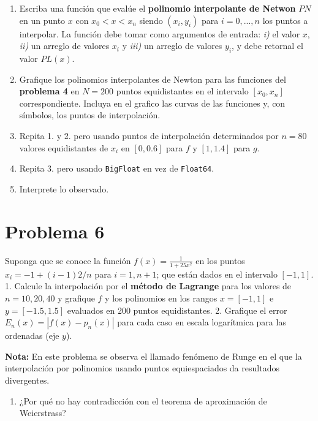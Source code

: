 \documentclass[11pt]{article}
\providecommand{\tightlist}{%
      \setlength{\itemsep}{0pt}\setlength{\parskip}{0pt}}
\begin{document}
\begin{enumerate}
\def\labelenumi{\arabic{enumi}.}
\item
  Escriba una función que evalúe el \textbf{polinomio interpolante de
  Netwon} \(PN\) en un punto \(x\) con \(x_0 < x < x_n\) siendo
  \((x_i,y_i)\) para \(i=0,...,n\) los puntos a interpolar. La función
  debe tomar como argumentos de entrada: \emph{i)} el valor \(x\),
  \emph{ii)} un arreglo de valores \(x_i\) y \emph{iii)} un arreglo de
  valores \(y_i\), y debe retornal el valor \(PL(x)\).
\item
  Grafique los polinomios interpolantes de Newton para las funciones del
  \textbf{problema 4} en \(N=200\) puntos equidistantes en el intervalo
  \([x_0,x_n]\) correspondiente. Incluya en el grafico las curvas de las
  funciones y, con símbolos, los puntos de interpolación.
\item
  Repita 1. y 2. pero usando puntos de interpolación determinados por
  \(n=80\) valores equidistantes de \(x_i\) en \([0,0.6]\) para \(f\) y
  \([1,1.4]\) para \(g\).
\item
  Repita 3. pero usando \texttt{BigFloat} en vez de \texttt{Float64}.
\item
  Interprete lo observado.
\end{enumerate}

    \hypertarget{problema-6}{%
\section*{Problema 6}\label{problema-6}}

Suponga que se conoce la función \(f(x) = \frac{1}{1 + 25 x^2}\) en los
puntos \(x_i = -1 + (i-1) 2 / n\) para \(i=1,n+1\); que están dados en
el intervalo \([-1,1]\). 1. Calcule la interpolación por el
\textbf{método de Lagrange} para los valores de \(n=10, 20, 40\) y
grafique \(f\) y los polinomios en los rangos \(x=[-1,1]\) e
\(y=[-1.5,1.5]\) evaluados en 200 puntos equidistantes. 2. Grafique el
error \(E_n(x)=|f(x)-p_n(x)|\) para cada caso en escala logarítmica para
las ordenadas (eje \(y\)).

\textbf{Nota:} En este problema se observa el llamado fenómeno de Runge
en el que la interpolación por polinomios usando puntos equiespaciados
da resultados divergentes.

\begin{enumerate}
\def\labelenumi{\arabic{enumi}.}
\setcounter{enumi}{2}
\tightlist
\item
  ¿Por qué no hay contradicción con el teorema de aproximación de
  Weierstrass?
\end{enumerate}
\end{document}
